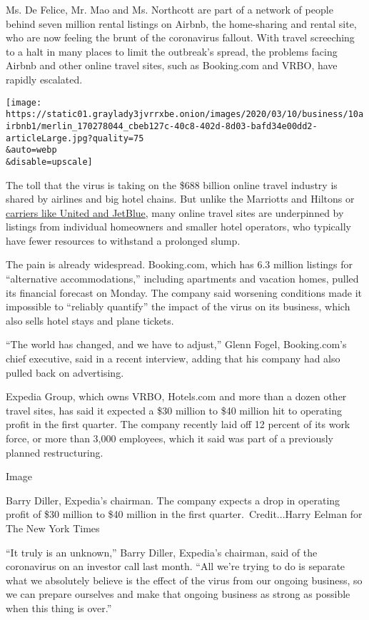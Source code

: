 Ms. De Felice, Mr. Mao and Ms. Northcott are part of a network of people
behind seven million rental listings on Airbnb, the home-sharing and
rental site, who are now feeling the brunt of the coronavirus fallout.
With travel screeching to a halt in many places to limit the outbreak's
spread, the problems facing Airbnb and other online travel sites, such
as Booking.com and VRBO, have rapidly escalated.

\texttt{[image: https://static01.graylady3jvrrxbe.onion/images/2020/03/10/business/10airbnb1/merlin\_170278044\_cbeb127c-40c8-402d-8d03-bafd34e00dd2-articleLarge.jpg?quality=75\\\&auto=webp\\\&disable=upscale]}

The toll that the virus is taking on the \$688 billion online travel
industry is shared by airlines and big hotel chains. But unlike the
Marriotts and Hiltons or
\href{https://www.nytimes3xbfgragh.onion/2020/03/05/business/coronavirus-airline-industry.html}{carriers
like United and JetBlue}, many online travel sites are underpinned by
listings from individual homeowners and smaller hotel operators, who
typically have fewer resources to withstand a prolonged slump.

The pain is already widespread. Booking.com, which has 6.3 million
listings for ``alternative accommodations,'' including apartments and
vacation homes, pulled its financial forecast on Monday. The company
said worsening conditions made it impossible to ``reliably quantify''
the impact of the virus on its business, which also sells hotel stays
and plane tickets.

``The world has changed, and we have to adjust,'' Glenn Fogel,
Booking.com's chief executive, said in a recent interview, adding that
his company had also pulled back on advertising.

Expedia Group, which owns VRBO, Hotels.com and more than a dozen other
travel sites, has said it expected a \$30 million to \$40 million hit to
operating profit in the first quarter. The company recently laid off 12
percent of its work force, or more than 3,000 employees, which it said
was part of a previously planned restructuring.

Image

Barry Diller, Expedia's chairman. The company expects a drop in
operating profit of \$30 million to \$40 million in the first
quarter.~Credit...Harry Eelman for The New York Times

``It truly is an unknown,'' Barry Diller, Expedia's chairman, said of
the coronavirus on an investor call last month. ``All we're trying to do
is separate what we absolutely believe is the effect of the virus from
our ongoing business, so we can prepare ourselves and make that ongoing
business as strong as possible when this thing is over.''

